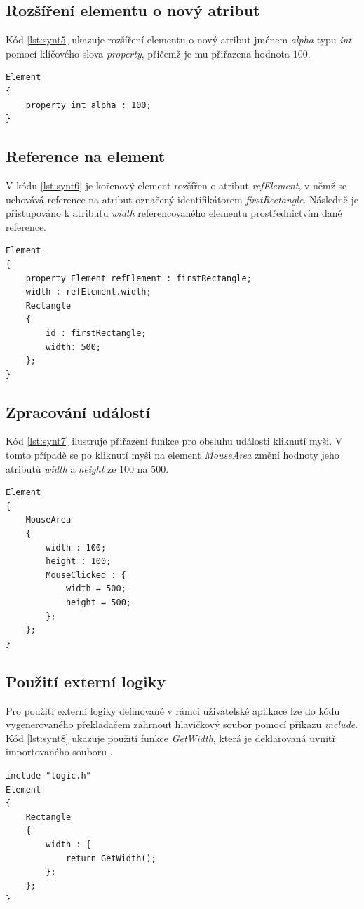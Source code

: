 \documentclass[11pt,twoside,a4paper]{book}
\begin{document}
\subsection{Rozšíření elementu o nový atribut}
Kód \ref{lst:synt5} ukazuje rozšíření elementu o nový atribut jménem \textit{alpha} typu \textit{int} pomocí klíčového slova \textit{property}, přičemž je mu přiřazena hodnota $100$.
\begin{lstlisting}[frame=single,caption=Syntaxe rozšíření elementu o nový atribut.,label=lst:synt5]
Element
{
	property int alpha : 100;
}
\end{lstlisting}


\subsection{Reference na element}
V kódu \ref{lst:synt6} je kořenový element rozšířen o atribut \textit{refElement}, v němž se uchovává reference na atribut označený identifikátorem \textit{firstRectangle}. Následně je přistupováno k atributu \textit{width} referencovaného elementu prostřednictvím dané reference.
\begin{lstlisting}[frame=single,caption=Ukázka přístupu k atributům elementu pomocí reference.,label=lst:synt6]
Element
{
	property Element refElement : firstRectangle;
	width : refElement.width;
	Rectangle
	{
		id : firstRectangle;
		width: 500;
	};
}
\end{lstlisting}

\subsection{Zpracování událostí}
Kód \ref{lst:synt7} ilustruje přiřazení funkce pro obsluhu události kliknutí myši. V tomto případě se po kliknutí myši na element \textit{MouseArea} změní hodnoty jeho atributů \textit{width} a \textit{height} ze $100$ na $500$.
\begin{lstlisting}[float,frame=single,caption=Syntaxe přiřazení funkce pro obsluhu události.,label=lst:synt7]
Element
{
	MouseArea
	{
		width : 100;
		height : 100;
		MouseClicked : {
			width = 500;
			height = 500;
		};
	};
}
\end{lstlisting}

\subsection{Použití externí logiky}
Pro použití externí logiky definované v rámci uživatelské aplikace lze do kódu vygenerovaného překladačem zahrnout hlavičkový soubor pomocí příkazu \textit{include}. Kód \ref{lst:synt8} ukazuje použití funkce \textit{GetWidth}, která je deklarovaná uvnitř importovaného souboru .
\begin{lstlisting}[frame=single,caption=Ukázka kódu používajícího externí funkci deklarovanou v hlavičkovém souboru.,label=lst:synt8]
include "logic.h"
Element
{
	Rectangle
	{
		width : {
			return GetWidth();
		};
	};
}
\end{lstlisting}
\end{document}

